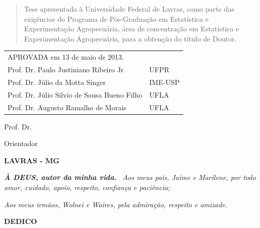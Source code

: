 \begin{flushright}
\begin{minipage}{9.6cm}
\begin{quote}
\begin{singlespace}
Tese apresentada à Universidade Federal de Lavras, como parte das 
exigências do Programa de Pós-Graduação em Estatística e 
Experimentação Agropecuária, área de concentração em Estatística e 
Experimentação Agropecuária, para a obtenção do título de Doutor.
\end{singlespace}
\end{quote}
\end{minipage}
\end{flushright}
\vspace{1cm}

\noindent\begin{tabular}{ll}
APROVADA em 13 de maio de 2013.\\
Prof. Dr. Paulo Justiniano Ribeiro Jr & UFPR\\
Prof. Dr. Júlio da Motta Singer & IME-USP\\
Prof. Dr. Júlio Silvio de Sousa Bueno Filho & UFLA\\
Prof. Dr. Augusto Ramalho de Morais & UFLA
\end{tabular}

\begin{center}
\begin{singlespace}
\vspace{0.8cm}
\centerline{Prof. Dr. \teseorientador}
\centerline{Orientador}
\vfill
{\textbf{LAVRAS - MG\\ \teseyear}}
\end{singlespace}
\end{center}

\newpage\null\thispagestyle{empty}\newpage


\vspace{1cm}
\begin{flushright}

\textit{\textbf{À DEUS, autor da minha vida.}\
\hspace{15cm} Aos meus pais, Jaime e Marilene, por todo amor, cuidado,
\hspace{13cm} apoio, respeito, confiança e paciência;}

\textit{Aos meus irmãos, Wolnei e Waires, pela admiração, respeito e amizade.}
 
\hspace{15cm}\textbf{DEDICO}
\end{flushright}

